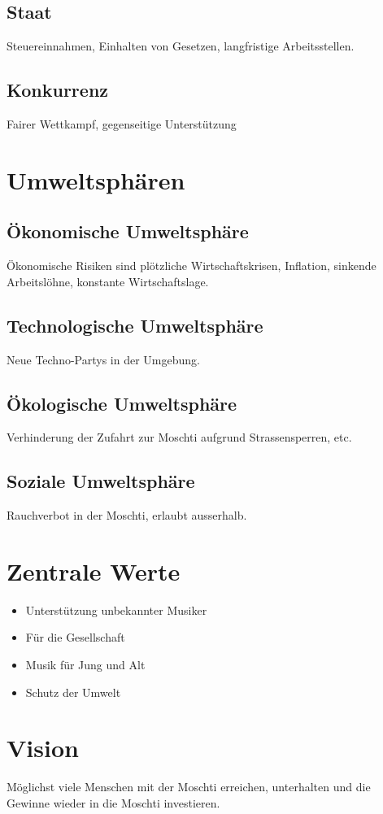 \documentclass[a4paper, titlepage]{article}
\begin{document}
\subsection{Staat}
Steuereinnahmen, Einhalten von Gesetzen, langfristige Arbeitsstellen.
\subsection{Konkurrenz}
Fairer Wettkampf, gegenseitige Unterstützung

\section{Umweltsphären}
\subsection{Ökonomische Umweltsphäre}
Ökonomische Risiken sind plötzliche Wirtschaftskrisen, Inflation, sinkende Arbeitslöhne, 
konstante Wirtschaftslage.
\subsection{Technologische Umweltsphäre}
Neue Techno-Partys in der Umgebung.
\subsection{Ökologische Umweltsphäre}
Verhinderung der Zufahrt zur Moschti aufgrund Strassensperren, etc.
\subsection{Soziale Umweltsphäre}
Rauchverbot in der Moschti, erlaubt ausserhalb. 
\section{Zentrale Werte}
\begin{itemize}
  \item Unterstützung unbekannter Musiker
  \item Für die Gesellschaft
  \item Musik für Jung und Alt
  \item Schutz der Umwelt
\end{itemize}
\section{Vision}
Möglichst viele Menschen mit der Moschti erreichen, unterhalten und die Gewinne wieder in die Moschti investieren. 
\end{document}
